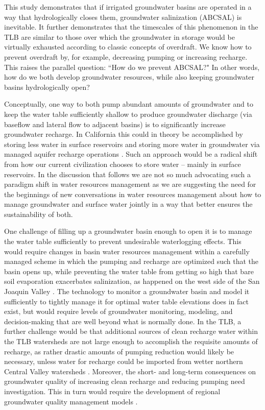 This study demonstrates that if irrigated groundwater basins are operated in a way that hydrologically closes them, groundwater salinization (ABCSAL) is inevitable. It further demonstrates that the timescales of this phenomenon in the TLB are similar to those over which the groundwater in storage would be virtually exhausted according to classic concepts of overdraft. We know how to prevent overdraft by, for example, decreasing pumping or increasing recharge. This raises the parallel question: ``How do we prevent ABCSAL?" In other words, how do we both develop groundwater resources, while also keeping groundwater basins hydrologically open? 

Conceptually, one way to both pump abundant amounts of groundwater and to keep the water table sufficiently shallow to produce groundwater discharge (via baseflow and lateral flow to adjacent basins) is to significantly increase groundwater recharge. In California this could in theory be accomplished by storing less water in surface reservoirs and storing more water in groundwater via managed aquifer recharge operations \citep{Kocis2017, ghasemizade2019integrated, gailey2019maximizing}. Such an approach would be a radical shift from how our current civilization chooses to store water -- mainly in surface reservoirs. In the discussion that follows we are not so much advocating such a paradigm shift in water resources management as we are suggesting the need for the beginnings of new conversations in water resources management about how to manage groundwater and surface water jointly in a way that better ensures the sustainability of both.

One challenge of filling up a groundwater basin enough to open it is to manage the water table sufficiently to prevent undesirable waterlogging effects. This would require changes in basin water resources management within a carefully managed scheme in which the pumping and recharge are optimized such that the basin opens up, while preventing the water table from getting so high that bare soil evaporation exacerbates salinization, as happened on the west side of the San Joaquin Valley \citep{Schoups2005, belitz1995alternative}. The technology to monitor a groundwater basin and model it sufficiently to tightly manage it for optimal water table elevations does in fact exist, but would require levels of groundwater monitoring, modeling, and decision-making that are well beyond what is normally done. In the TLB, a further challenge would be that additional sources of clean recharge water within the TLB watersheds are not large enough to accomplish the requisite amounts of recharge, as rather drastic amounts of pumping reduction would likely be necessary, unless water for recharge could be imported from wetter northern Central Valley watersheds \citep{Hanak2019}. Moreover, the short- and long-term consequences on groundwater quality of increasing clean recharge and reducing pumping need investigation. This in turn would require the development of regional groundwater quality management models \citep{Fogg2006, kourakos2014vectorized}.%

